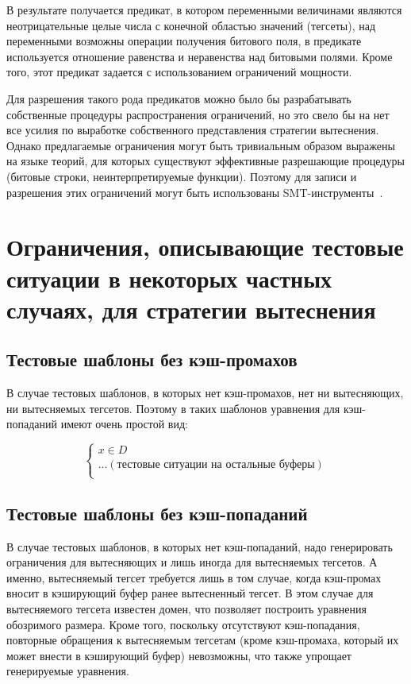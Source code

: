 В результате получается предикат, в котором переменными величинами
являются неотрицательные целые числа с конечной областью значений
(тегсеты), над переменными возможны операции получения битового
поля, в предикате используется отношение равенства и неравенства над
битовыми полями. Кроме того, этот предикат задается с использованием
ограничений мощности.

Для разрешения такого рода предикатов можно было бы разрабатывать
собственные процедуры распространения ограничений, но это свело бы
на нет все усилия по выработке собственного представления стратегии
вытеснения. Однако предлагаемые ограничения могут быть тривиальным
образом выражены на языке теорий, для которых существуют эффективные
разрешающие процедуры (битовые строки, неинтерпретируемые функции).
Поэтому для записи и разрешения этих ограничений могут быть
использованы SMT-инструменты~\cite{Z3}.


\pagebreak
\section{Ограничения, описывающие тестовые ситуации в некоторых
частных случаях, для стратегии вытеснения \LRU}

\subsection{Тестовые шаблоны без кэш-промахов}

В случае тестовых шаблонов, в которых нет кэш-промахов, нет ни
вытесняющих, ни вытесняемых тегсетов. Поэтому в таких шаблонов
уравнения для кэш-попаданий имеют очень простой вид:

$$
\left\{
\begin{array}{l}
x \in D\\
... (\mbox{тестовые ситуации на остальные буферы})\\
\end{array}
\right.
$$

\subsection{Тестовые шаблоны без кэш-попаданий}

В случае тестовых шаблонов, в которых нет кэш-попаданий, надо
генерировать ограничения для вытесняющих и лишь иногда для
вытесняемых тегсетов. А именно, вытесняемый тегсет требуется лишь в
том случае, когда кэш-промах вносит в кэширующий буфер ранее
вытесненный тегсет. В этом случае для вытесняемого тегсета известен
домен, что позволяет построить уравнения обозримого размера. Кроме
того, поскольку отсутствуют кэш-попадания, повторные обращения к
вытесняемым тегсетам (кроме кэш-промаха, который их может внести в
кэширующий буфер) невозможны, что также упрощает генерируемые
уравнения.

